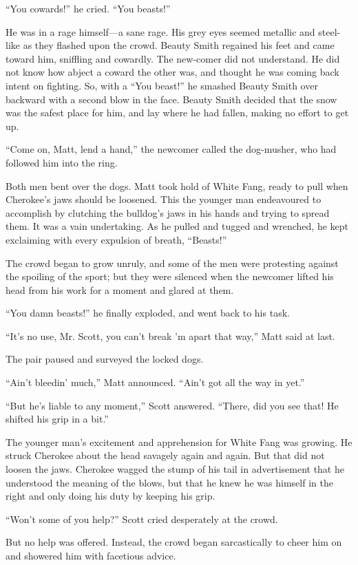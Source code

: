 \documentclass[10pt]{book}
\begin{document}
“You cowards!” he cried. “You beasts!”

He was in a rage himself—a sane rage. His grey eyes seemed metallic and
steel-like as they flashed upon the crowd. Beauty Smith regained his
feet and came toward him, sniffling and cowardly. The new-comer did not
understand. He did not know how abject a coward the other was, and
thought he was coming back intent on fighting. So, with a “You beast!”
he smashed Beauty Smith over backward with a second blow in the face.
Beauty Smith decided that the snow was the safest place for him, and
lay where he had fallen, making no effort to get up.

“Come on, Matt, lend a hand,” the newcomer called the dog-musher, who
had followed him into the ring.

Both men bent over the dogs. Matt took hold of White Fang, ready to
pull when Cherokee’s jaws should be loosened. This the younger man
endeavoured to accomplish by clutching the bulldog’s jaws in his hands
and trying to spread them. It was a vain undertaking. As he pulled and
tugged and wrenched, he kept exclaiming with every expulsion of breath,
“Beasts!”

The crowd began to grow unruly, and some of the men were protesting
against the spoiling of the sport; but they were silenced when the
newcomer lifted his head from his work for a moment and glared at them.

“You damn beasts!” he finally exploded, and went back to his task.

“It’s no use, Mr. Scott, you can’t break ’m apart that way,” Matt said
at last.

The pair paused and surveyed the locked dogs.

“Ain’t bleedin’ much,” Matt announced. “Ain’t got all the way in yet.”

“But he’s liable to any moment,” Scott answered. “There, did you see
that! He shifted his grip in a bit.”

The younger man’s excitement and apprehension for White Fang was
growing. He struck Cherokee about the head savagely again and again.
But that did not loosen the jaws. Cherokee wagged the stump of his tail
in advertisement that he understood the meaning of the blows, but that
he knew he was himself in the right and only doing his duty by keeping
his grip.

“Won’t some of you help?” Scott cried desperately at the crowd.

But no help was offered. Instead, the crowd began sarcastically to
cheer him on and showered him with facetious advice.
\end{document}
